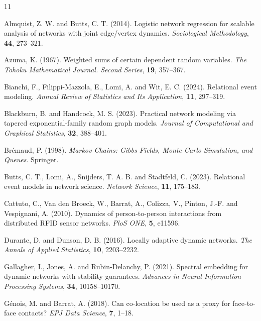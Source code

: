 \documentclass[12pt]{article}
\newcommand{\0}{{\bf 0}}
\begin{document}
\begin{thebibliography}{11}

Almquist, Z. W. and Butts, C. T. (2014). Logistic network regression for scalable analysis of networks with joint edge/vertex dynamics. \textit{Sociological Methodology}, \textbf{44}, 273--321.

Azuma, K. (1967). Weighted sums of certain dependent random variables. \textit{The Tohoku Mathematical Journal. Second Series}, \textbf{19}, 357–367.

Bianchi, F., Filippi-Mazzola, E., Lomi, A. and Wit, E. C. (2024). Relational event modeling. \textit{Annual Review of Statistics and Its Application}, \textbf{11}, 297--319.

Blackburn, B. and Handcock, M. S. (2023). Practical network modeling via tapered exponential-family random graph models. \textit{Journal of Computational and Graphical Statistics}, \textbf{32}, 388--401.

Br\'{e}maud, P. (1998). \textit{Markov Chains: Gibbs Fields, Monte Carlo Simulation, and Queues}. Springer.

Butts, C. T., Lomi, A., Snijders, T. A. B. and Stadtfeld, C. (2023). Relational event models in network science. \textit{Network Science}, \textbf{11}, 175--183.

Cattuto, C., Van den Broeck, W., Barrat, A., Colizza, V., Pinton, J.-F. and Vespignani, A. (2010). Dynamics of person-to-person interactions from distributed RFID sensor networks. \textit{PloS ONE}, \textbf{5}, e11596.

Durante, D. and Dunson, D. B. (2016). Locally adaptive dynamic networks. \textit{The Annals of Applied Statistics}, \textbf{10}, 2203--2232.

Gallagher, I., Jones, A. and Rubin-Delanchy, P. (2021). Spectral embedding for dynamic networks with stability guarantees. \textit{Advances in Neural Information Processing Systems}, \textbf{34}, 10158--10170.

G\'{e}nois, M. and Barrat, A. (2018). Can co-location be used as a proxy for face-to-face contacts? \textit{EPJ Data Science}, \textbf{7}, 1–18.



\end{thebibliography}
\end{document}

